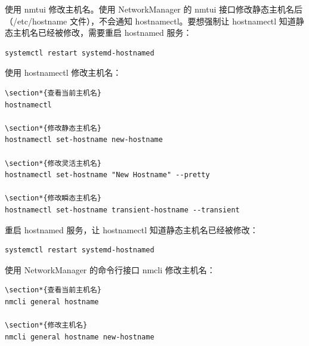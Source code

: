 \documentclass[12pt,UTF8]{ctexbook}
\begin{document}
使用 nmtui 修改主机名。使用 NetworkManager 的 nmtui 接口修改静态主机名后（/etc/hostname 文件），不会通知 hostnamectl。要想强制让 hostnamectl 知道静态主机名已经被修改，需要重启 hostnamed 服务：

\begin{verbatim}
systemctl restart systemd-hostnamed
\end{verbatim}

使用 hostnamectl 修改主机名：

\begin{verbatim}
\section*{查看当前主机名}
hostnamectl

\section*{修改静态主机名}
hostnamectl set-hostname new-hostname

\section*{修改灵活主机名}
hostnamectl set-hostname "New Hostname" --pretty

\section*{修改瞬态主机名}
hostnamectl set-hostname transient-hostname --transient
\end{verbatim}

重启 hostnamed 服务，让 hostnamectl 知道静态主机名已经被修改：

\begin{verbatim}
systemctl restart systemd-hostnamed
\end{verbatim}

使用 NetworkManager 的命令行接口 nmcli 修改主机名：

\begin{verbatim}
\section*{查看当前主机名}
nmcli general hostname

\section*{修改主机名}
nmcli general hostname new-hostname
\end{verbatim}
\end{document}
